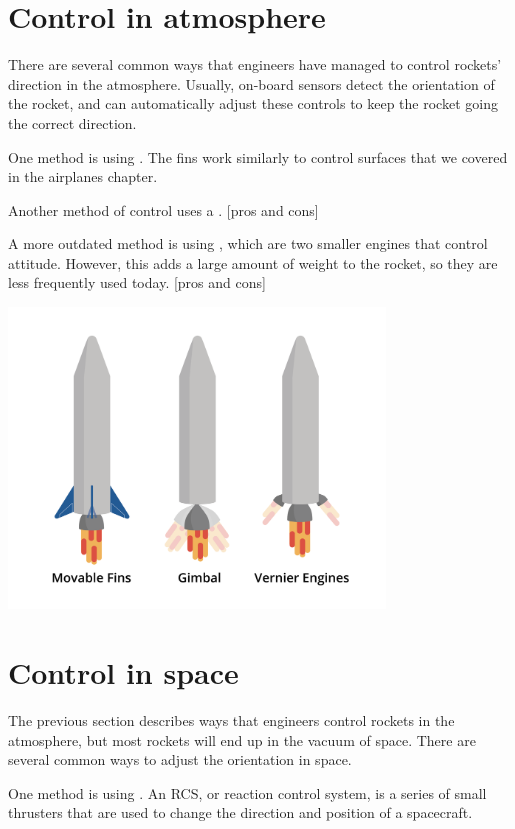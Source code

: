 \section{Control in atmosphere}

There are several common ways that engineers have managed to control rockets' direction in the atmosphere. Usually, on-board sensors detect the orientation of the rocket, and can automatically adjust these controls to keep the rocket going the correct direction.

	
	One method is using . The fins work similarly to control surfaces that we covered in the airplanes chapter. 



	Another method of control uses a . [pros and cons]
	
	A more outdated method is using , which are two smaller engines that control attitude. However, this adds a large amount of weight to the rocket, so they are less frequently used today. [pros and cons]


\includegraphics[width=0.75\textwidth]{control.png}


\section{Control in space}

The previous section describes ways that engineers control rockets in the atmosphere, but most rockets will end up in the vacuum of space. There are several common ways to adjust the orientation in space.

	One method is using . An RCS, or reaction control system, is a series of small thrusters that are used to change the direction and position of a spacecraft. 

